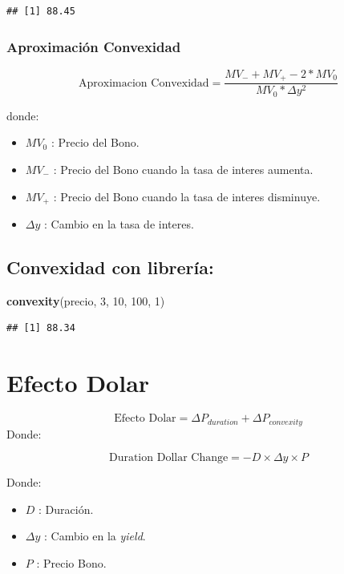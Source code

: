 \documentclass[12pt,]{book}
\newenvironment{Shaded}{\begin{snugshade}}{\end{snugshade}}
\newcommand{\KeywordTok}[1]{\textcolor[rgb]{0.13,0.29,0.53}{\textbf{#1}}}
\newcommand{\DecValTok}[1]{\textcolor[rgb]{0.00,0.00,0.81}{#1}}
\newcommand{\NormalTok}[1]{#1}
\providecommand{\tightlist}{%
  \setlength{\itemsep}{0pt}\setlength{\parskip}{0pt}}
\begin{document}
\begin{verbatim}
## [1] 88.45
\end{verbatim}

\subsubsection{Aproximación Convexidad}\label{aproximacion-convexidad}

\[
\text{Aproximacion Convexidad} = \frac{MV_{-}+MV_{+}-2*MV_{0}}{MV_{0}*\Delta y^2}
\]

donde:

\begin{itemize}
\tightlist
\item
  \(MV_{0}\) : Precio del Bono.
\item
  \(MV_{-}\) : Precio del Bono cuando la tasa de interes aumenta.
\item
  \(MV_{+}\) : Precio del Bono cuando la tasa de interes disminuye.
\item
  \(\Delta y\) : Cambio en la tasa de interes.
\end{itemize}

\subsection{Convexidad con librería:}\label{convexidad-con-libreria}

\begin{Shaded}
\begin{Highlighting}[]
\KeywordTok{convexity}\NormalTok{(precio, }\DecValTok{3}\NormalTok{, }\DecValTok{10}\NormalTok{, }\DecValTok{100}\NormalTok{, }\DecValTok{1}\NormalTok{)}
\end{Highlighting}
\end{Shaded}

\begin{verbatim}
## [1] 88.34
\end{verbatim}

\section{Efecto Dolar}\label{efecto-dolar}

\[
\text{Efecto Dolar} = \Delta P_{duration} + \Delta P_{convexity}  
\] Donde:

\[
\text{Duration Dollar Change} = -D \times \Delta y \times P 
\]

Donde:

\begin{itemize}
\tightlist
\item
  \(D\) : Duración.
\item
  \(\Delta y\) : Cambio en la \emph{yield}.
\item
  \(P\) : Precio Bono.
\end{itemize}
\end{document}
